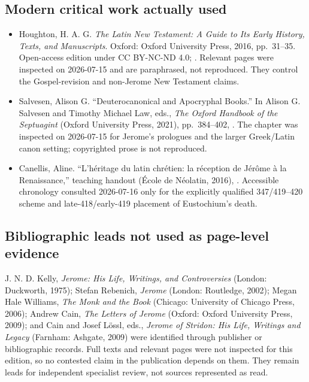 \subsection{Modern critical work actually used}

\begin{itemize}
\item Houghton, H. A. G. \emph{The Latin New Testament: A Guide to Its Early
History, Texts, and Manuscripts}. Oxford: Oxford University Press, 2016,
pp.~31--35. Open-access edition under CC BY-NC-ND 4.0;
.
Relevant pages were inspected on 2026-07-15 and are paraphrased, not reproduced.
They control the Gospel-revision and non-Jerome New Testament claims.
\item Salvesen, Alison G. ``Deuterocanonical and Apocryphal Books.'' In Alison
G. Salvesen and Timothy Michael Law, eds., \emph{The Oxford Handbook of the
Septuagint} (Oxford University Press, 2021), pp.~384--402,
.
The chapter was inspected on 2026-07-15 for Jerome's prologues and the larger
Greek/Latin canon setting; copyrighted prose is not reproduced.
\item Canellis, Aline. ``L'h\'eritage du latin chr\'etien: la r\'eception de
J\'er\^ome \`a la Renaissance,'' teaching handout (\'Ecole de N\'eolatin,
2016),
.
Accessible chronology consulted 2026-07-16 only for the explicitly qualified
347/419--420 scheme and late-418/early-419 placement of Eustochium's death.
\end{itemize}

\subsection{Bibliographic leads not used as page-level evidence}

J. N. D. Kelly, \emph{Jerome: His Life, Writings, and Controversies}
(London: Duckworth, 1975); Stefan Rebenich, \emph{Jerome} (London: Routledge,
2002); Megan Hale Williams, \emph{The Monk and the Book} (Chicago: University
of Chicago Press, 2006); Andrew Cain, \emph{The Letters of Jerome} (Oxford:
Oxford University Press, 2009); and Cain and Josef L\"ossl, eds., \emph{Jerome
of Stridon: His Life, Writings and Legacy} (Farnham: Ashgate, 2009) were
identified through publisher or bibliographic records. Full texts and relevant
pages were not inspected for this edition, so no contested claim in the
publication depends on them. They remain leads for independent specialist
review, not sources represented as read.


